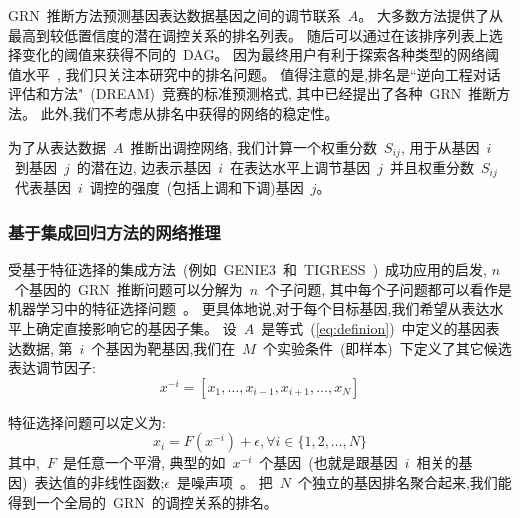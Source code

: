 GRN~推断方法预测基因表达数据基因之间的调节联系~$A$。
大多数方法提供了从最高到较低置信度的潜在调控关系的排名列表。
随后可以通过在该排序列表上选择变化的阈值来获得不同的~DAG。
因为最终用户有利于探索各种类型的网络阈值水平~\cite{slawek2013ennet},
我们只关注本研究中的排名问题。
值得注意的是,排名是``逆向工程对话评估和方法"~(DREAM)~\cite{stolovitzky2007dialogue}竞赛的标准预测格式,
其中已经提出了各种~GRN~推断方法。
此外,我们不考虑从排名中获得的网络的稳定性。

为了从表达数据~$A$~推断出调控网络,
我们计算一个权重分数~$S_{ij}$,
用于从基因~$i$~到基因~$j$~的潜在边,
边表示基因~$i$~在表达水平上调节基因~$j$~并且权重分数~$S_{ij}$~代表基因~$i$~调控的强度~(包括上调和下调)基因~$j$。

\subsubsection{基于集成回归方法的网络推理}
受基于特征选择的集成方法~(例如~GENIE3~\cite{huynh2010inferring}和~TIGRESS~\cite{Haury2012})~成功应用的启发,
$n$~个基因的~GRN~推断问题可以分解为~$n$~个子问题,
其中每个子问题都可以看作是机器学习中的特征选择问题~\cite{nasrabadi2007pattern}。
更具体地说,对于每个目标基因,我们希望从表达水平上确定直接影响它的基因子集。
设~$A$~是等式~(\ref{eq:definion})~中定义的基因表达数据,
第~$i$~个基因为靶基因,我们在~$M$~个实验条件~(即样本)~下定义了其它候选表达调节因子:
\begin{equation}
  \label{eq:x}
  x^{-i} = [x_1,\ldots,x_{i-1},x_{i+1},\ldots,x_N]
  \end{equation}

特征选择问题可以定义为:
\begin{equation}
\label{eq:fs}
x_i =  F(x^{-i}) + \epsilon , \forall i \in \{1,2,\ldots,N\}
\end{equation}
其中,~$F$~是任意一个平滑, 典型的如~$x^{-i}$~个基因~(也就是跟基因~$i$~相关的基因)~表达值的非线性函数;$\epsilon$~是噪声项~\cite{huynh2010inferring,Haury2012}。
把~$N$~个独立的基因排名聚合起来,我们能得到一个全局的~GRN~的调控关系的排名。

